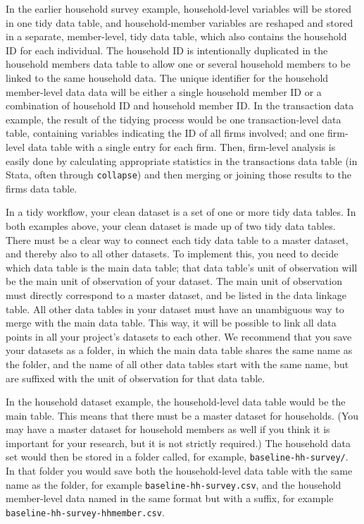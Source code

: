 \documentclass[
]{book}
\begin{document}
In the earlier household survey example,
household-level variables will be stored in one tidy data table,
and household-member variables are reshaped
and stored in a separate, member-level, tidy data table,
which also contains the household ID for each individual.
The household ID is intentionally duplicated in the household members data table
to allow one or several household members to be linked to the same household data.
The unique identifier for the household member-level data data will be
either a single household member ID or
a combination of household ID and household member ID.
In the transaction data example,
the result of the tidying process would be one transaction-level data table,
containing variables indicating the ID of all firms involved;
and one firm-level data table with a single entry for each firm.
Then, firm-level analysis is easily done
by calculating appropriate statistics in the transactions data table
(in Stata, often through \texttt{collapse})
and then merging or joining those results to the firms data table.

In a tidy workflow, your clean dataset is a set of one or more tidy data tables.
In both examples above, your clean dataset is made up of two tidy data tables.
There must be a clear way to connect each
tidy data table to a master dataset,
and thereby also to all other datasets.
To implement this, you need to decide which data table is the main data table;
that data table's unit of observation will be
the main unit of observation of your dataset.
The main unit of observation must directly correspond to a master dataset,
and be listed in the data linkage table.
All other data tables in your dataset must have
an unambiguous way to merge with the main data table.
This way, it will be possible to link
all data points in all your project's datasets to each other.
We recommend that you save your datasets as a folder,
in which the main data table shares the same name as the folder,
and the name of all other data tables start with the same name,
but are suffixed with the unit of observation for that data table.

In the household dataset example,
the household-level data table would be the main table.
This means that there must be a master dataset for households.
(You may have a master dataset for household members as well
if you think it is important for your research,
but it is not strictly required.)
The household data set would then be stored in a folder called,
for example, \texttt{baseline-hh-survey/}.
In that folder you would save both
the household-level data table with the same name as the folder,
for example \texttt{baseline-hh-survey.csv},
and the household member-level data named in the same format but with a suffix,
for example \texttt{baseline-hh-survey-hhmember.csv}.
\end{document}
